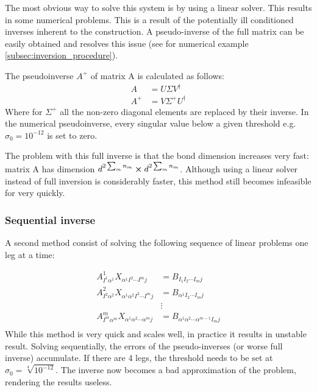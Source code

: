 The most obvious way to solve this system is by using a linear solver. This results in some numerical problems. This is a result of the potentially ill conditioned inverses inherent to the construction. A pseudo-inverse of the full matrix can be easily obtained and resolves this issue (see for numerical example \cref{subsec:inversion_procedure}).

The pseudoinverse $A^{+}$ of matrix A is calculated as follows:
\begin{align}
    A     & = U \Sigma V^{\dagger}     \\
    A^{+} & = V \Sigma^{+} U^{\dagger}
\end{align}
Where for $\Sigma^{+}$ all the non-zero diagonal elements are replaced by their inverse. In the numerical pseudoinverse, every singular value below a given threshold e.g. $\sigma_0 = 10^{-12}$ is set to zero.

The problem with this full inverse is that the bond dimension increases very fast: matrix A has dimension $d^ {2 \sum_m n_m } \cross d^ {2 \sum_m n_m } $. Although using a linear solver instead of full inversion is considerably faster, this method still becomes infeasible for very quickly.

\subsubsection{Sequential inverse}

A second method consist of solving the following sequence of linear problems one leg at a time:

\begin{equation}
    \begin{split}
        A^1_{ I^1 \alpha^1 } X_{ \alpha^1  I^2 \cdots I^m j} &=  B_{  I_1  I_2 \cdots I_m   j }\\
        A^2_{ I^2 \alpha^2 } X_{ \alpha^1   \alpha^2  I^3 \cdots I^m j} &=  B_{  \alpha^1  I_2 \cdots I_m   j }\\
        &\vdots\\
        A^m_{ I^m \alpha^m } X_{ \alpha^1 \alpha^2 \cdots \alpha^m j  } &=  B_{ \alpha^1 \alpha^2 \cdots \alpha^{m-1} I_m   j }\\
    \end{split}
\end{equation}
While this method is very quick and scales well, in practice it results in unstable result. Solving sequentially, the errors of the pseudo-inverses (or worse full inverse) accumulate. If there are 4 legs, the threshold needs to be set at $ \sigma_0 = \sqrt[4]{ 10^{-12} } $. The inverse now becomes a bad approximation of the problem, rendering the results useless.

